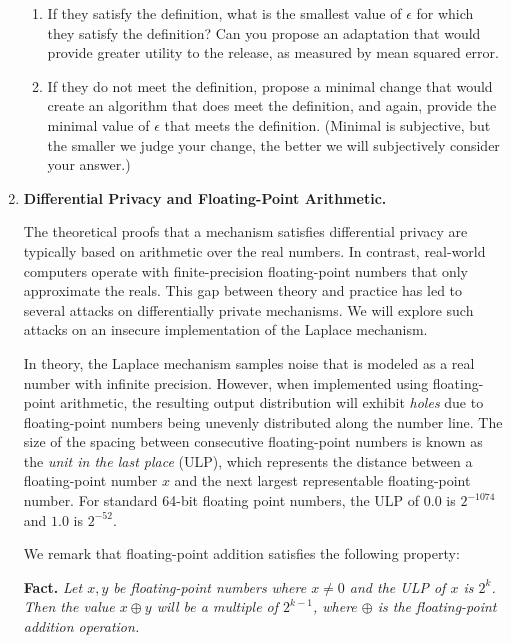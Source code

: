 \documentclass[11pt]{article}
\begin{document}
\begin{enumerate}[leftmargin=*]
\begin{enumerate}
    \item If they satisfy the definition, what is the smallest value of $\epsilon$ for which they satisfy the definition?  Can you propose an adaptation that would provide greater utility to the release, as measured by mean squared error.
    \item If they do not meet the definition, propose a minimal change that would create an algorithm that does meet the definition, and again, provide the minimal value of $\epsilon$ that meets the definition.  (Minimal is subjective, but the smaller we judge your change, the better we will subjectively consider your answer.)
\fi
\end{enumerate}

\newpage

\item \textbf{Differential Privacy and Floating-Point Arithmetic.}

The theoretical proofs that a mechanism satisfies differential privacy are typically based on arithmetic over the real numbers. In contrast, real-world computers operate with finite-precision floating-point numbers that only approximate the reals. This gap between theory and practice has led to several attacks on differentially private mechanisms. 
We will explore such attacks on an insecure implementation of the Laplace mechanism. 

In theory, the Laplace mechanism samples noise that is modeled as a real number with infinite precision. However, when implemented using floating-point arithmetic, the resulting output distribution will exhibit \emph{holes} due to floating-point numbers being unevenly distributed along the number line. The size of the spacing between consecutive floating-point numbers is known as the \emph{unit in the last place} (ULP), which represents the distance between a floating-point number $x$ and the next largest representable floating-point number. For standard 64-bit floating point numbers, the ULP of $0.0$ is $2^{-1074}$ and $1.0$ is $2^{-52}$.

We remark that floating-point addition satisfies the following property:


\bigskip

\textbf{Fact.}\textit{
    Let $x, y$ be floating-point numbers where $x\ne 0$ and the ULP of $x$ is $2^k$. Then the value $x\oplus y$ will be a multiple of $2^{k-1}$, where $\oplus$ is the floating-point addition operation.}

\bigskip



\end{enumerate}
\end{document}
